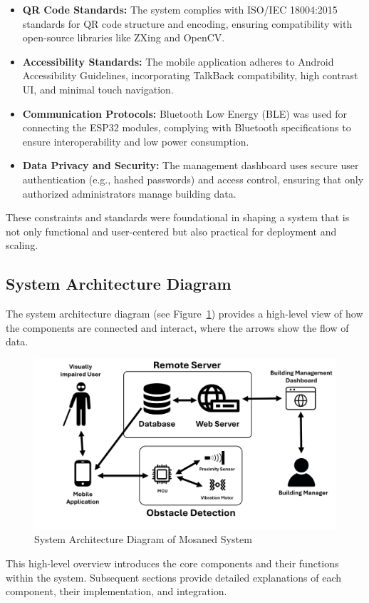 \begin{itemize}
	\item \textbf{QR Code Standards:} The system complies with ISO/IEC 18004:2015 standards for QR code structure and encoding, ensuring compatibility with open-source libraries like ZXing and OpenCV.
	
	\item \textbf{Accessibility Standards:} The mobile application adheres to Android Accessibility Guidelines, incorporating TalkBack compatibility, high contrast UI, and minimal touch navigation.
	
	
	\item \textbf{Communication Protocols:} Bluetooth Low Energy (BLE) was used for connecting the ESP32 modules, complying with Bluetooth specifications to ensure interoperability and low power consumption.
	
	\item \textbf{Data Privacy and Security:} The management dashboard uses secure user authentication (e.g., hashed passwords) and access control, ensuring that only authorized administrators manage building data.
\end{itemize}

These constraints and standards were foundational in shaping a system that is not only functional and user-centered but also practical for deployment and scaling.



\subsection{System Architecture Diagram}

The system architecture diagram (see Figure~\ref{fig:system_architecture}) provides a high-level view of how the components are connected and interact, where the arrows show the flow of data. 

\begin{figure}[h]
	\centering
	\includegraphics[width=1\linewidth]{assets/ch2/sys_arch}
	\caption{System Architecture Diagram of Mosaned System}
	\label{fig:system_architecture}
\end{figure}

This high-level overview introduces the core components and their functions within the system. Subsequent sections provide detailed explanations of each component, their implementation, and integration.
